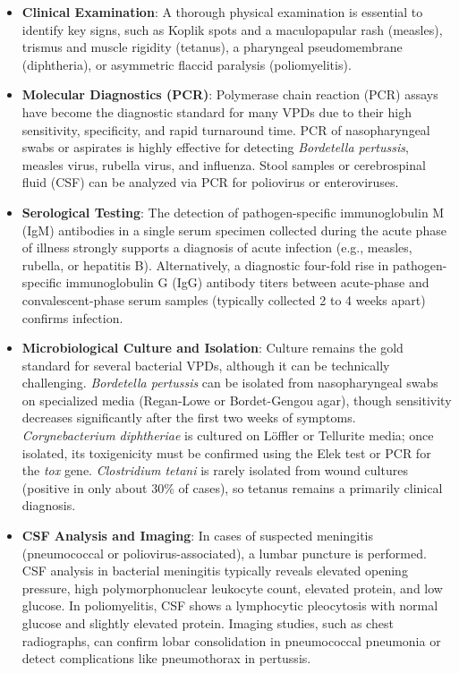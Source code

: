 \begin{itemize}
    \item \textbf{Clinical Examination}: A thorough physical examination is essential to identify key signs, such as Koplik spots and a maculopapular rash (measles), trismus and muscle rigidity (tetanus), a pharyngeal pseudomembrane (diphtheria), or asymmetric flaccid paralysis (poliomyelitis).
    \item \textbf{Molecular Diagnostics (PCR)}: Polymerase chain reaction (PCR) assays have become the diagnostic standard for many VPDs due to their high sensitivity, specificity, and rapid turnaround time. PCR of nasopharyngeal swabs or aspirates is highly effective for detecting \textit{Bordetella pertussis}, measles virus, rubella virus, and influenza. Stool samples or cerebrospinal fluid (CSF) can be analyzed via PCR for poliovirus or enteroviruses.
    \item \textbf{Serological Testing}: The detection of pathogen-specific immunoglobulin M (IgM) antibodies in a single serum specimen collected during the acute phase of illness strongly supports a diagnosis of acute infection (e.g., measles, rubella, or hepatitis B). Alternatively, a diagnostic four-fold rise in pathogen-specific immunoglobulin G (IgG) antibody titers between acute-phase and convalescent-phase serum samples (typically collected 2 to 4 weeks apart) confirms infection.
    \item \textbf{Microbiological Culture and Isolation}: Culture remains the gold standard for several bacterial VPDs, although it can be technically challenging. \textit{Bordetella pertussis} can be isolated from nasopharyngeal swabs on specialized media (Regan-Lowe or Bordet-Gengou agar), though sensitivity decreases significantly after the first two weeks of symptoms. \textit{Corynebacterium diphtheriae} is cultured on Löffler or Tellurite media; once isolated, its toxigenicity must be confirmed using the Elek test or PCR for the \textit{tox} gene. \textit{Clostridium tetani} is rarely isolated from wound cultures (positive in only about 30\% of cases), so tetanus remains a primarily clinical diagnosis.
    \item \textbf{CSF Analysis and Imaging}: In cases of suspected meningitis (pneumococcal or poliovirus-associated), a lumbar puncture is performed. CSF analysis in bacterial meningitis typically reveals elevated opening pressure, high polymorphonuclear leukocyte count, elevated protein, and low glucose. In poliomyelitis, CSF shows a lymphocytic pleocytosis with normal glucose and slightly elevated protein. Imaging studies, such as chest radiographs, can confirm lobar consolidation in pneumococcal pneumonia or detect complications like pneumothorax in pertussis.
\end{itemize}


